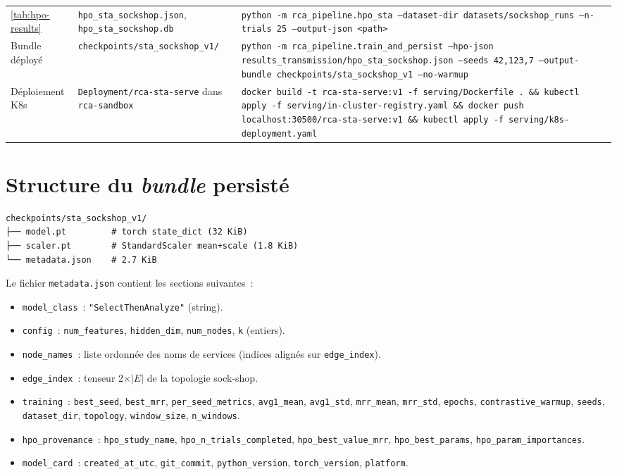 \documentclass[a4paper,11pt,oneside]{report}
\begin{document}
\begin{longtable}{p{}p{}p{}}
\cref{tab:hpo-results} & \texttt{hpo\_sta\_sockshop.json}, \texttt{hpo\_sta\_sockshop.db} & \texttt{python -m rca\_pipeline.hpo\_sta --dataset-dir datasets/sockshop\_runs --n-trials 25 --output-json <path>} \\
Bundle d\'eploy\'e & \texttt{checkpoints/sta\_sockshop\_v1/} & \texttt{python -m rca\_pipeline.train\_and\_persist --hpo-json results\_transmission/hpo\_sta\_sockshop.json --seeds 42,123,7 --output-bundle checkpoints/sta\_sockshop\_v1 --no-warmup} \\
D\'eploiement K8s & \texttt{Deployment/rca-sta-serve} dans \texttt{rca-sandbox} & \texttt{docker build -t rca-sta-serve:v1 -f serving/Dockerfile . \&\& kubectl apply -f serving/in-cluster-registry.yaml \&\& docker push localhost:30500/rca-sta-serve:v1 \&\& kubectl apply -f serving/k8s-deployment.yaml} \\
\end{longtable}

\chapter{Structure du \emph{bundle} persist\'e}
\label{ann:bundle}

\begin{lstlisting}[style=shell,caption={Contenu d'un bundle.}]
checkpoints/sta_sockshop_v1/
├── model.pt         # torch state_dict (32 KiB)
├── scaler.pt        # StandardScaler mean+scale (1.8 KiB)
└── metadata.json    # 2.7 KiB
\end{lstlisting}

Le fichier \texttt{metadata.json} contient les sections suivantes~:

\begin{itemize}
  \item \texttt{model\_class}~: \texttt{"SelectThenAnalyze"} (string).
  \item \texttt{config}~: \texttt{num\_features}, \texttt{hidden\_dim}, \texttt{num\_nodes}, \texttt{k} (entiers).
  \item \texttt{node\_names}~: liste ordonn\'ee des noms de services (indices align\'es sur \texttt{edge\_index}).
  \item \texttt{edge\_index}~: tenseur 2$\times$$|E|$ de la topologie sock-shop.
  \item \texttt{training}~: \texttt{best\_seed}, \texttt{best\_mrr}, \texttt{per\_seed\_metrics}, \texttt{avg1\_mean}, \texttt{avg1\_std}, \texttt{mrr\_mean}, \texttt{mrr\_std}, \texttt{epochs}, \texttt{contrastive\_warmup}, \texttt{seeds}, \texttt{dataset\_dir}, \texttt{topology}, \texttt{window\_size}, \texttt{n\_windows}.
  \item \texttt{hpo\_provenance}~: \texttt{hpo\_study\_name}, \texttt{hpo\_n\_trials\_completed}, \texttt{hpo\_best\_value\_mrr}, \texttt{hpo\_best\_params}, \texttt{hpo\_param\_importances}.
  \item \texttt{model\_card}~: \texttt{created\_at\_utc}, \texttt{git\_commit}, \texttt{python\_version}, \texttt{torch\_version}, \texttt{platform}.
\end{itemize}
\end{document}
